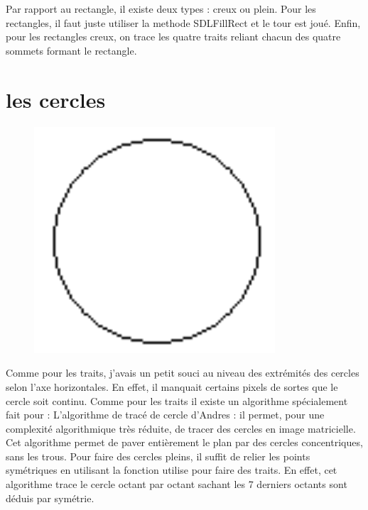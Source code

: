 \documentclass[12pt, a4paper]{report}
\begin{document}
Par rapport au rectangle, il existe deux types : creux ou plein. Pour les rectangles, il faut juste utiliser la methode SDLFillRect et le tour est joué. Enfin, pour les rectangles creux, on trace les quatre traits reliant chacun des quatre sommets formant le rectangle.

\newpage

\section {les cercles }

\begin{figure}[!h]
\begin{center} \includegraphics[width=0.8\textwidth]{images/cercle.png} \end{center}
\end{figure}

Comme pour les traits, j’avais un petit souci au niveau des extrémités des cercles selon l’axe horizontales. En effet, il manquait certains pixels de sortes que le cercle soit continu. Comme pour les traits il existe un algorithme spécialement fait pour : L’algorithme de tracé de cercle d'Andres : il permet, pour une complexité algorithmique très réduite, de tracer des cercles en image matricielle. Cet algorithme permet de paver entièrement le plan par des cercles concentriques, sans les trous.
Pour faire des cercles pleins, il suffit de relier les points symétriques en utilisant la fonction utilise pour faire des traits. En effet, cet algorithme trace le cercle octant par octant sachant les 7 derniers octants sont déduis par symétrie.
\end{document}

